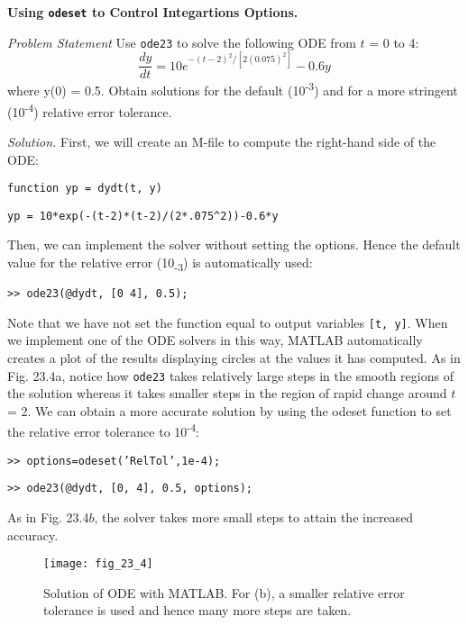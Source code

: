 \documentclass[../main.tex]{subfiles}
\begin{document}
\begin{example}\textbf{Using \texttt{odeset} to Control Integartions Options.}

    \noindent\textit{Problem Statement} \quad Use \texttt{ode23} to solve the following ODE from $t$ = 0 to 4:
        \begin{equation}
        \frac{d y}{d t}=10 e^{-(t-2)^{2} /\left[2(0.075)^{2}\right]}-0.6 y  \nonumber
    \end{equation} 
\noindent where y(0) = 0.5. Obtain solutions for the default (10\textsuperscript{-3}) and for a more stringent (10\textsuperscript{-4}) relative error tolerance.

\noindent\textit{Solution.} First, we will create an M-file to compute the right-hand side of the ODE:\

\texttt{function yp = dydt(t, y)}

\texttt{yp = 10*exp(-(t-2)*(t-2)/(2*.075\^{}2))-0.6*y}

\noindent Then, we can implement the solver without setting the options. Hence the default value for
the relative error (10\textsubscript{-3}) is automatically used:

\texttt{>> ode23(@dydt, [0 4], 0.5);}

\noindent Note that we have not set the function equal to output variables \texttt{[t, y]}. When we implement one of the ODE solvers in this way, MATLAB automatically creates a plot of the
results displaying circles at the values it has computed. As in Fig. 23.4a, notice how \texttt{ode23}
takes relatively large steps in the smooth regions of the solution whereas it takes smaller
steps in the region of rapid change around $t$ = 2.
We can obtain a more accurate solution by using the odeset function to set the relative error tolerance to 10\textsuperscript{-4}:

\texttt{>> options=odeset('RelTol',1e-4);}

\texttt{>> ode23(@dydt, [0, 4], 0.5, options);}

\noindent As in Fig. 23.4$b$, the solver takes more small steps to attain the increased accuracy.

\begin{figure}[H]
    \centering
    \texttt{[image: fig\_23\_4]}
   \caption{\textsf{Solution of ODE with MATLAB. For (b), a smaller relative error tolerance is used and hence many
   more steps are taken.}}\label{fig:fig_23_4}
\end{figure}
\end{example}
\end{document}
